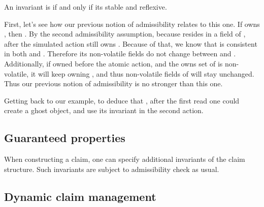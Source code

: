 An invariant is  if and only if its stable and reflexive.

First, let's see how our previous notion of admissibility relates to this one.
If  owns , then .
By the second admissibility assumption, because  resides
in a field of , after the simulated action  still owns .
Because of that, we know that  is consistent in both  and .
Therefore its non-volatile fields do not change between  and .
Additionally, if  owned  before the atomic action, and the owns set of  is non-volatile,
it will keep owning , and thus non-volatile fields of 
will stay unchanged.
Thus our previous notion of admissibility is no stronger than this one.

Getting back to our  example, to deduce that , after
the first read one could create a ghost  object, and
use its invariant in the second action.

\subsection{Guaranteed properties}

When constructing a claim, one can specify additional invariants of the claim
structure.
Such invariants are subject to admissibility check as usual.


\subsection{Dynamic claim management}


